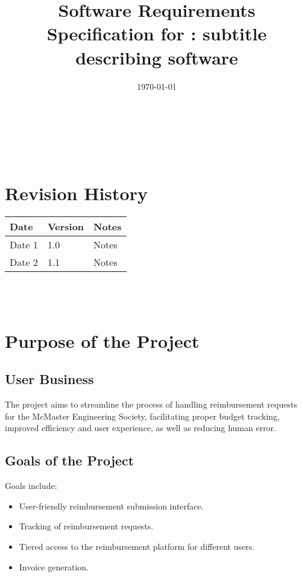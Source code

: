 \documentclass[12pt]{article}
\begin{document}
\title{Software Requirements Specification for \progname: subtitle describing software} 
\author{\authname}
\date{\today}
	
\maketitle

~\newpage


\tableofcontents

~\newpage

\section*{Revision History}

\begin{tabularx}{\textwidth}{p{3cm}p{2cm}X}
\toprule {\textbf{Date}} & {\textbf{Version}} & {\textbf{Notes}}\\
\midrule
Date 1 & 1.0 & Notes\\
Date 2 & 1.1 & Notes\\
\bottomrule
\end{tabularx}

~\\

~\newpage
\section{Purpose of the Project}
\subsection{User Business}
The project aims to streamline the process of handling reimbursement requests for the McMaster Engineering Society, facilitating proper budget tracking, improved efficiency and user experience, as well as reducing human error.

\subsection{Goals of the Project}
Goals include:
\begin{itemize}
    \item User-friendly reimbursement submission interface.
    \item Tracking of reimbursement requests.
    \item Tiered access to the reimbursement platform for different users.
    \item Invoice generation.
\end{itemize}
\end{document}
